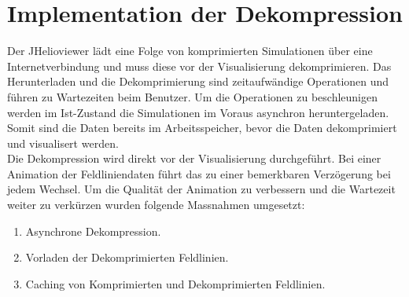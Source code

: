 \section{Implementation der Dekompression}
Der JHelioviewer lädt eine Folge von komprimierten Simulationen über eine Internetverbindung und muss diese vor der Visualisierung dekomprimieren. Das Herunterladen und die Dekomprimierung sind zeitaufwändige Operationen und führen zu Wartezeiten beim Benutzer. Um die Operationen zu beschleunigen werden im Ist-Zustand die Simulationen im Voraus asynchron heruntergeladen. Somit sind die Daten bereits im Arbeitsspeicher, bevor die Daten dekomprimiert und visualisert werden.\\
Die Dekompression wird direkt vor der Visualisierung durchgeführt. Bei einer Animation der Feldliniendaten führt das zu einer bemerkbaren Verzögerung bei jedem Wechsel. Um die Qualität der Animation zu verbessern und die Wartezeit weiter zu verkürzen wurden folgende Massnahmen umgesetzt:
\begin{enumerate}
	\item Asynchrone Dekompression.
	\item Vorladen der Dekomprimierten Feldlinien.
	\item Caching von Komprimierten und Dekomprimierten Feldlinien.
\end{enumerate}

